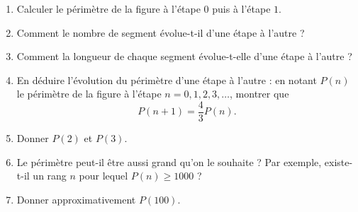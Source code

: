 \documentclass[12pt]{paper}
\theoremstyle{plain}
\theoremstyle{definition}
\begin{document}
{	\begin{enumerate}
		\item Calculer le périmètre de la figure à l'étape $0$ puis à l'étape $1$.
		\item Comment le nombre de segment évolue-t-il d'une étape à l'autre ?
		\item Comment la longueur de chaque segment évolue-t-elle d'une étape à l'autre ?
		\item En déduire l'évolution du périmètre d'une étape à l'autre :
		en notant $P(n)$ le périmètre de la figure à l'étape $n=0, 1, 2, 3,\dots$, montrer que
			\[ P(n+1) = \dfrac43 P(n). \]
		\item Donner $P(2)$ et $P(3)$.
		\item Le périmètre peut-il être aussi grand qu'on le souhaite ? Par exemple, existe-t-il un rang $n$ pour lequel $P(n) \geq 1000$ ?
		\item Donner approximativement $P(100)$.
	\end{enumerate}
}{}
\end{document}
